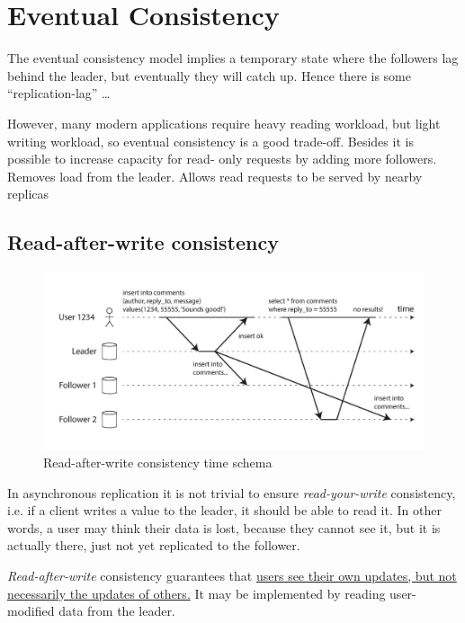 \section{Eventual Consistency}
The eventual consistency model implies a temporary state where the followers lag behind the leader, but eventually they will catch up. 
Hence there is some ``replication-lag'' \dots

However, many modern applications require heavy reading workload, but light writing workload, so eventual consistency is a good trade-off.
Besides it is possible to increase capacity for read- only requests by adding more followers. Removes load from the leader. Allows read requests to be served by nearby replicas 

\subsection{Read-after-write consistency}
\begin{paracol}{2}
   \begin{figure}[htbp]
      \centering
      \includegraphics[width=0.95\columnwidth]{images/10/readafterwrite.png}
      \caption{Read-after-write consistency time schema}
      \label{fig:10/readafterwrite}
   \end{figure}


   \switchcolumn
   \colfill
   In asynchronous replication it is not trivial to ensure \textit{read-your-write} consistency, i.e. if a client writes a value to the leader, it should be able to read it.
   In other words, a user may think their data is lost, because they cannot see it, but it is actually there, just not yet replicated to the follower.
   
   \textit{Read-after-write} consistency guarantees that \ul{users see their own updates, but not necessarily the updates of others.}
   It may be implemented by reading user-modified data from the leader.
   \colfill
\end{paracol}


